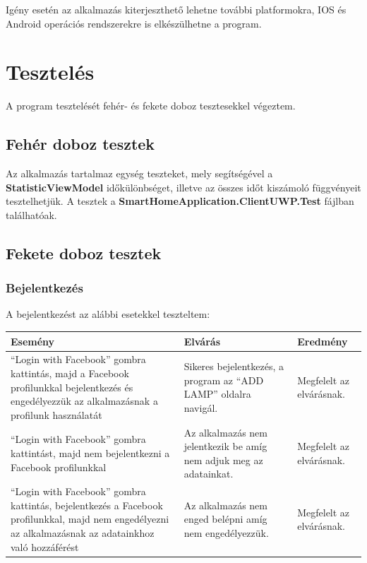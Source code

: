 \documentclass[a4paper,12pt]{report}
\begin{document}
    Igény esetén az alkalmazás kiterjeszthető lehetne további platformokra, IOS és Android operációs rendszerekre is elkészülhetne
    a program.

\section{Tesztelés}
    A program tesztelését fehér- és fekete doboz tesztesekkel végeztem.

\subsection{Fehér doboz tesztek}
    Az alkalmazás tartalmaz egység teszteket, mely segítségével a \textbf{StatisticViewModel} időkülönbséget, illetve az összes időt
    kiszámoló függvényeit tesztelhetjük. A tesztek a \textbf{SmartHomeApplication.ClientUWP.Test} fájlban találhatóak.

\subsection{Fekete doboz tesztek}

\subsubsection{Bejelentkezés}
    A bejelentkezést az alábbi esetekkel teszteltem:\\

\begin{center}
    \begin{tabular}{ | m{4.5cm} | m{4.5cm} | m{4.5cm} |}
        \hline
        Esemény & Elvárás & Eredmény \\ \hline
        ``Login with Facebook'' gombra kattintás, majd a Facebook profilunkkal bejelentkezés és engedélyezzük az alkalmazásnak
        a profilunk használatát & Sikeres bejelentkezés, a program az ``ADD LAMP'' oldalra navigál. & Megfelelt az elvárásnak. \\ \hline
        ``Login with Facebook'' gombra kattintást, majd nem bejelentkezni a Facebook profilunkkal & Az alkalmazás nem jelentkezik be
        amíg nem adjuk meg az adatainkat. & Megfelelt az elvárásnak. \\ \hline
        ``Login with Facebook'' gombra kattintás, bejelentkezés a Facebook profilunkkal, majd nem engedélyezni az alkalmazásnak az
        adatainkhoz való hozzáférést & Az alkalmazás nem enged belépni amíg nem engedélyezzük. & Megfelelt az elvárásnak. \\ \hline
        \hline
    \end{tabular}
\end{center}
\end{document}

